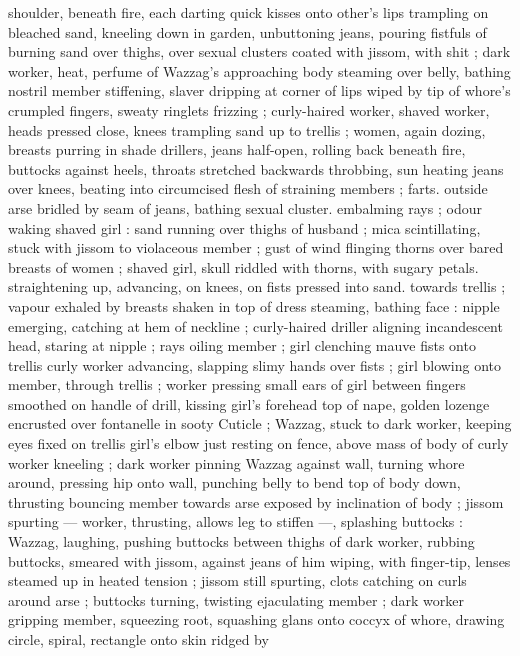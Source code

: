 shoulder, beneath fire, each darting quick kisses onto other's lips
trampling on bleached sand, kneeling down in garden, unbuttoning
jeans, pouring fistfuls of burning sand over thighs, over sexual
clusters coated with jissom, with shit ; dark worker, heat, perfume of
Wazzag's approaching body steaming over belly, bathing nostril
member stiffening, slaver dripping at corner of lips wiped by tip of
whore's crumpled fingers, sweaty ringlets frizzing ; curly-haired
worker, shaved worker, heads pressed close, knees trampling sand
up to trellis ; women, again dozing, breasts purring in shade
drillers, jeans half-open, rolling back beneath fire, buttocks against
heels, throats stretched backwards throbbing, sun heating jeans over
knees, beating into circumcised flesh of straining members ; farts.
outside arse bridled by seam of jeans, bathing sexual cluster.
embalming rays ; odour waking shaved girl : sand running over
thighs of husband ; mica scintillating, stuck with jissom to violaceous
member ; gust of wind flinging thorns over bared breasts of women
; shaved girl, skull riddled with thorns, with sugary petals.
straightening up, advancing, on knees, on fists pressed into sand.
towards trellis ; vapour exhaled by breasts shaken in top of dress
steaming, bathing face : nipple emerging, catching at hem of
neckline ; curly-haired driller aligning incandescent head, staring at
nipple ; rays oiling member ; girl clenching mauve fists onto trellis
curly worker advancing, slapping slimy hands over fists ; girl blowing
onto member, through trellis ; worker pressing small ears of girl
between fingers smoothed on handle of drill, kissing girl's forehead
top of nape, golden lozenge encrusted over fontanelle in sooty
Cuticle ; Wazzag, stuck to dark worker, keeping eyes fixed on trellis
girl's elbow just resting on fence, above mass of body of curly
worker kneeling ; dark worker pinning Wazzag against wall, turning
whore around, pressing hip onto wall, punching belly to bend top of
body down, thrusting bouncing member towards arse exposed by
inclination of body ; jissom spurting --- worker, thrusting, allows leg
to stiffen ---, splashing buttocks : Wazzag, laughing, pushing
buttocks between thighs of dark worker, rubbing buttocks, smeared
with jissom, against jeans of him wiping, with finger-tip, lenses
steamed up in heated tension ; jissom still spurting, clots catching on
curls around arse ; buttocks turning, twisting ejaculating member ;
dark worker gripping member, squeezing root, squashing glans onto
coccyx of whore, drawing circle, spiral, rectangle onto skin ridged by
